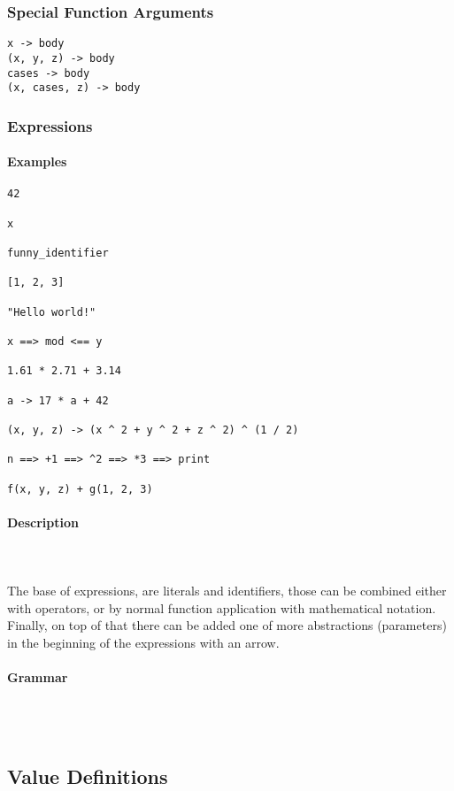\documentclass{article}
\def\pend{\mbox{} \\\\}
\begin{document}
\subsubsection{Special Function Arguments}

\begin{verbatim}
x -> body
(x, y, z) -> body
cases -> body
(x, cases, z) -> body
\end{verbatim}

\subsubsection{Expressions}

\paragraph{Examples}

\begin{verbatim}
42

x

funny_identifier 

[1, 2, 3]

"Hello world!"

x ==> mod <== y

1.61 * 2.71 + 3.14

a -> 17 * a + 42

(x, y, z) -> (x ^ 2 + y ^ 2 + z ^ 2) ^ (1 / 2)

n ==> +1 ==> ^2 ==> *3 ==> print

f(x, y, z) + g(1, 2, 3)
\end{verbatim}

\paragraph{Description}\pend
The base of expressions, are literals and identifiers, those can be combined either
with operators, or by normal function application with mathematical notation. 
Finally, on top of that there can be added one of more abstractions (parameters)
in the beginning of the expressions with an arrow.

\paragraph{Grammar}\pend

\subsection{Value Definitions}
\end{document}
